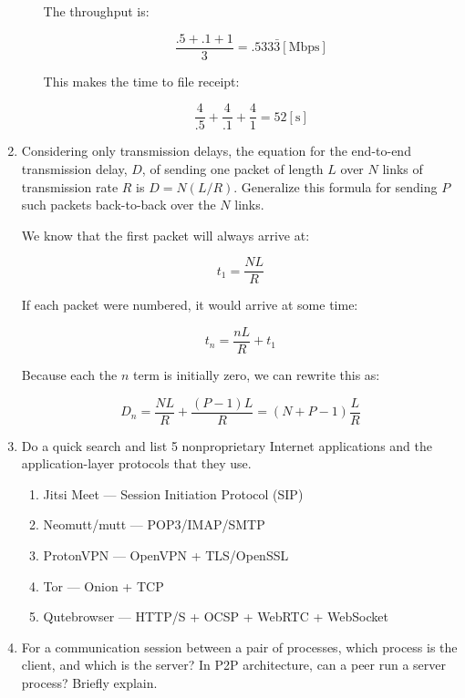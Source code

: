 \begin{enumerate}
\begin{enumerate}
        The throughput is:

        $$\frac{.5+.1+1}{3}=.533\bar{3}[\text{Mbps}]$$

        This makes the time to file receipt:

        $$\frac{4}{.5}+\frac{4}{.1}+\frac{4}{1}=52[\si{\second}]$$

    \end{enumerate}
    
  \item Considering only transmission delays, the equation for the end-to-end transmission delay, $D$, of sending one packet of length $L$ over $N$ links of transmission rate $R$ is $D=N(L/R)$. Generalize this formula for sending $P$ such packets back-to-back over the $N$ links.

    We know that the first packet will always arrive at:

    $$t_1=\frac{NL}{R}$$

    If each packet were numbered, it would arrive at some time:

    $$t_n=\frac{nL}{R}+t_1$$

    Because each the $n$ term is initially zero, we can rewrite this as:

    $$D_n=\frac{NL}{R}+\frac{(P-1)L}{R}=(N+P-1)\frac{L}{R}$$
    
  \item Do a quick search and list 5 nonproprietary Internet applications and the application-layer protocols that they use.

    \begin{enumerate}

      \item Jitsi Meet — Session Initiation Protocol (SIP)

      \item Neomutt/mutt — POP3/IMAP/SMTP

      \item ProtonVPN — OpenVPN + TLS/OpenSSL

      \item Tor — Onion + TCP

      \item Qutebrowser — HTTP/S + OCSP + WebRTC + WebSocket

    \end{enumerate}
    
  \item For a communication session between a pair of processes, which process is the client, and which is the server? In P2P architecture, can a peer run a server process? Briefly explain.


\end{enumerate}
